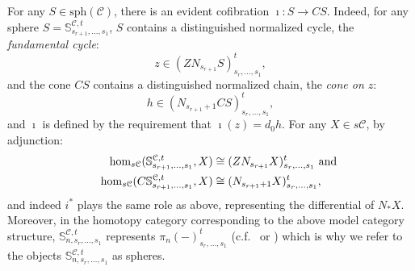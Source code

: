 \documentclass[11pt]{amsart} \renewcommand{\baselinestretch}{1.2}
\theoremstyle{plain}
\theoremstyle{definition}
\newcommand{\DASH}{\mathrm{-}}
\renewcommand{\to}{\longrightarrow}
\newcommand{\calc}{\mathcal{C}}
\newcommand{\spheres}[1]{\mathrm{sph}(#1)}
\newcommand{\citeBOX}[2][]{\cite[\mbox{#1}]{#2}}
\begin{document}
\begin{Pi-algebras and cohomology algebras}
For any $S\in\spheres{\calc}$, there is an evident cofibration $\imath :S\to CS$. Indeed, for any sphere $S=\mathbb{S}^{\calc,t}_{s_{r+1},\ldots,s_1}$, $S$ contains  a distinguished normalized cycle, the \emph{fundamental cycle}:
\[z\in (ZN_{s_{r+1}}S)_{s_r,\ldots,s_1}^t,\]
and the cone $CS$ contains a distinguished normalized chain, the \emph{cone on $z$}:
\[h\in (N_{s_{r+1}+1}CS)_{s_r,\ldots,s_1}^t,\]
and $\imath$ is defined by the requirement that $\imath(z)=d_0h$.
For any $X\in s\calc$, by adjunction:
\begin{alignat*}{2}
\hom_{s\calc}(\mathbb{S}^{\calc,t}_{s_{r+1},\ldots,s_1},X)&\cong (ZN_{s_{r+1}}X)_{s_r,\ldots,s_1}^t\makebox[0cm][l]{ and}\\
\hom_{s\calc}(C\mathbb{S}^{\calc,t}_{s_{r+1},\ldots,s_1},X)&\cong (N_{s_{r+1}+1}X)_{s_r,\ldots,s_1}^t,
\end{alignat*}
and indeed $i^*$ plays the same role as above, representing the differential of $N_*X$. Moreover, in the homotopy category corresponding to the above model category structure, $\mathbb{S}^{\calc,t}_{n,s_r,\ldots,s_1}$ represents $\pi_n(\DASH)^t_{s_r,\ldots,s_1}$ (c.f.\ \citeBOX[\S1]{MR1089001} or \citeBOX[\S3.1.1]{Blanc_Stover-Groth_SS.pdf}) which is why  we  refer to the objects $\mathbb{S}^{\calc,t}_{n,s_r,\ldots,s_1}$ as spheres.


\end{Pi-algebras and cohomology algebras}
\end{document}
